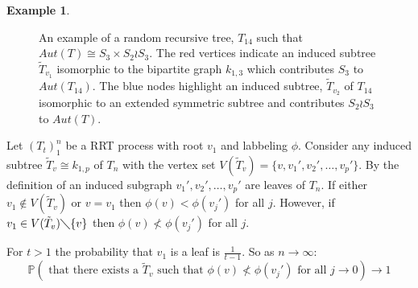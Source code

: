 \documentclass[12pt]{article} %
\theoremstyle{definition}
\newtheorem{ex}[thm]{Example}
\begin{document}
\begin{ex}

\begin{figure}[H]
\centering
{}
\caption{An example of a random recursive tree, $T_{14}$ such that $Aut(T) \cong S_{3} \times S_{2}\wr S_{3}$.  The red vertices indicate an induced subtree $\tilde{T}_{v_{1}}$ isomorphic to the bipartite graph $k_{1,3}$ which contributes $S_{3}$ to $Aut(T_{14})$. The blue nodes highlight an induced subtree, $\tilde{T}_{v_{2}}$ of $T_{14}$ isomorphic to an extended symmetric subtree and contributes $S_{2}\wr S_{3}$ to $Aut(T)$.}\label{fig2}
\end{figure}

\end{ex}
 

 
Let $(T_{t})_{1}^{n}$ be a RRT process with root $v_{1}$ and labbeling $\phi$.  Consider any induced subtree $\tilde{T}_{v} \cong k_{1,p}$ of $T_{n}$ with the vertex set $V(\tilde{T}_{v}) = \{v,v_{1}',v_{2}',\dots,v_{p}'\}$.  By the definition of an induced subgraph $v_{1}',v_{2}',\dots,v_{p}'$ are leaves of $T_{n}$.  If either $v_{1} \notin V(\tilde{T}_{v})$ or $v = v_{1}$ then $\phi (v) < \phi (v_{j}')$ for all $j$.  However, if $v_{1} \in V(\tilde{T}_{v}) \diagdown \{v\}$ then $\phi(v) \nless \phi(v_{j}')$ for all $j$.

For $t>1$ the probability that $v_{1}$ is a leaf is $\frac{1}{t-1}$.  So as $n \rightarrow\infty$:
\[\mathbb{P} (\text{ that there exists a  }  \tilde{T}_{v} \text{  such that  }  \phi(v) \nless \phi(v_{j}') \text{  for all  } j \rightarrow 0)\rightarrow 1\]
 
\end{document}
